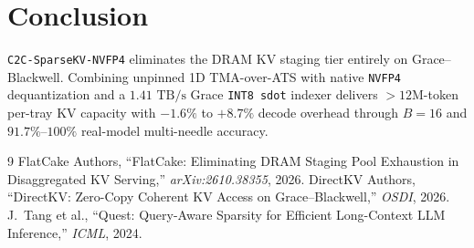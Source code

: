 \documentclass[conference,10pt]{IEEEtran}
\begin{document}
\section{Conclusion}
\texttt{C2C-SparseKV-NVFP4} eliminates the DRAM KV staging tier entirely on Grace--Blackwell. Combining unpinned 1D TMA-over-ATS with native \texttt{NVFP4} dequantization and a $1.41\text{ TB/s}$ Grace \texttt{INT8 sdot} indexer delivers $>12\text{M}$-token per-tray KV capacity with $-1.6\%$ to $+8.7\%$ decode overhead through $B{=}16$ and $91.7\%$--$100\%$ real-model multi-needle accuracy.

\begin{thebibliography}{9}
 FlatCake Authors, ``FlatCake: Eliminating DRAM Staging Pool Exhaustion in Disaggregated KV Serving,'' \emph{arXiv:2610.38355}, 2026.
 DirectKV Authors, ``DirectKV: Zero-Copy Coherent KV Access on Grace--Blackwell,'' \emph{OSDI}, 2026.
 J.~Tang et al., ``Quest: Query-Aware Sparsity for Efficient Long-Context LLM Inference,'' \emph{ICML}, 2024.
\end{thebibliography}
\end{document}
